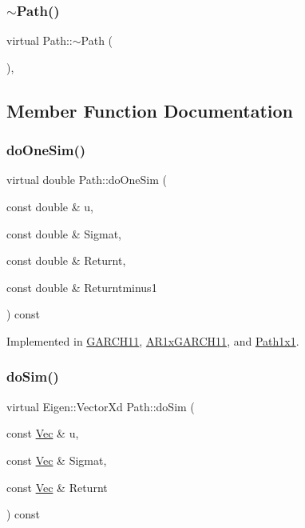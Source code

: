 \subsubsection{\texorpdfstring{$\sim$\+Path()}{~Path()}}
{\footnotesize\ttfamily virtual Path\+::$\sim$\+Path (\begin{DoxyParamCaption}{ }\end{DoxyParamCaption})\hspace{0.3cm}{\ttfamily [inline]}, {\ttfamily [virtual]}}



\subsection{Member Function Documentation}
\hypertarget{classPath_a6e75e5a329c48cafecd03a355f90b694}{}\label{classPath_a6e75e5a329c48cafecd03a355f90b694} 
\subsubsection{\texorpdfstring{do\+One\+Sim()}{doOneSim()}}
{\footnotesize\ttfamily virtual double Path\+::do\+One\+Sim (\begin{DoxyParamCaption}\item[{const double \&}]{u,  }\item[{const double \&}]{Sigmat,  }\item[{const double \&}]{Returnt,  }\item[{const double \&}]{Returntminus1 }\end{DoxyParamCaption}) const\hspace{0.3cm}{\ttfamily [pure virtual]}}



Implemented in \hyperlink{classGARCH11_a8f6e87b2b85a91e02416d4d02bf7b9ff}{G\+A\+R\+C\+H11}, \hyperlink{classAR1xGARCH11_ac30812d6e8339c48abcd5c0ce8ea0081}{A\+R1x\+G\+A\+R\+C\+H11}, and \hyperlink{classPath1x1_a522e73958cc571997153baa179b451cd}{Path1x1}.

\hypertarget{classPath_a8917612a585bce52dbd52b1b643a517a}{}\label{classPath_a8917612a585bce52dbd52b1b643a517a} 
\subsubsection{\texorpdfstring{do\+Sim()}{doSim()}}
{\footnotesize\ttfamily virtual Eigen\+::\+Vector\+Xd Path\+::do\+Sim (\begin{DoxyParamCaption}\item[{const \hyperlink{compute__returns__eigen_8h_a1eb6a9306ef406d7975f3cbf2e247777}{Vec} \&}]{u,  }\item[{const \hyperlink{compute__returns__eigen_8h_a1eb6a9306ef406d7975f3cbf2e247777}{Vec} \&}]{Sigmat,  }\item[{const \hyperlink{compute__returns__eigen_8h_a1eb6a9306ef406d7975f3cbf2e247777}{Vec} \&}]{Returnt }\end{DoxyParamCaption}) const\hspace{0.3cm}{\ttfamily [pure virtual]}}



